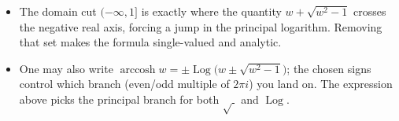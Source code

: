 \documentclass[12pt]{article}
\DeclareMathOperator{\Log}{Log}
\theoremstyle{definition} %
\theoremstyle{plain} %
\begin{document}
\begin{itemize}
  \item The domain cut $(-\infty,1]$ is exactly where the quantity
        $w+\sqrt{w^{2}-1}$ crosses the negative real axis, forcing a jump
        in the principal logarithm.  Removing that set makes the formula
        single-valued and analytic.
  \item One may also write
        $\displaystyle\operatorname{arccosh}w
                  =\pm\Log\!\bigl(w\pm\sqrt{w^{2}-1}\bigr)$;
        the chosen signs control which branch (even/odd multiple of
        $2\pi i$) you land on.  The expression above picks the principal
        branch for both $\sqrt{\;}$ and $\Log$.
\end{itemize}
\pagebreak
\end{document}
